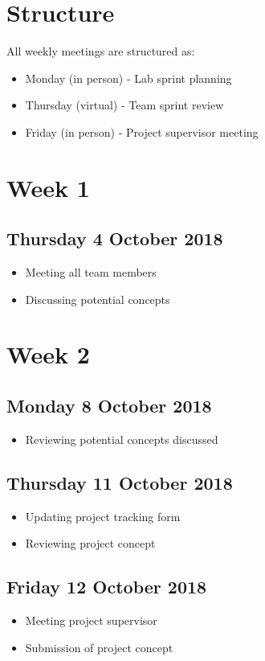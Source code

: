 \section*{Structure}
All weekly meetings are structured as:
\begin{itemize}
	\item Monday (in person) - Lab sprint planning
	\item Thursday (virtual) - Team sprint review
	\item Friday (in person) - Project supervisor meeting
\end{itemize}

\section*{Week 1}
\subsection*{Thursday 4 October 2018}
\begin{itemize}
	\item Meeting all team members
	\item Discussing potential concepts
\end{itemize}

\section*{Week 2}
\subsection*{Monday 8 October 2018}
\begin{itemize}
	\item Reviewing potential concepts discussed
\end{itemize}

\subsection*{Thursday 11 October 2018}
\begin{itemize}
	\item Updating project tracking form
	\item Reviewing project concept
\end{itemize}

\subsection*{Friday 12 October 2018}
\begin{itemize}
	\item Meeting project supervisor
	\item Submission of project concept
\end{itemize}

